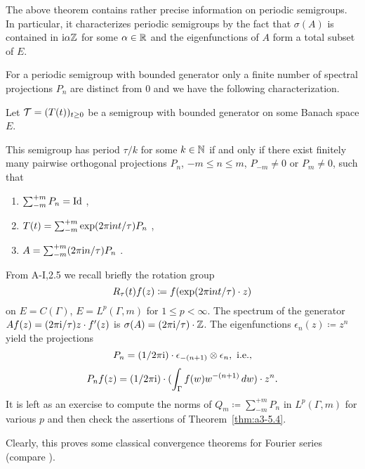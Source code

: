 The above theorem contains rather precise information on periodic semigroups.
In particular, it characterizes periodic semigroups by the fact that $\sigma(A)$ is contained in $\mathrm{i}\alpha\mathbb{Z}$ for some $\alpha \in \mathbb{R}$ and the eigenfunctions of $A$ form a total subset of $E$.

For a periodic semigroup with bounded generator
only a finite number of spectral projections $P_{n}$ are distinct from $0$ and we have the following characterization.
\begin{corollary}\label{cor:a3-5.5}
Let $\mathcal{T} = (T(t))_{t \geq 0}$ be a semigroup with bounded generator on some Banach space $E$.

This semigroup has period $\tau/k$ for some $k \in \mathbb{N}$ if and only if there exist finitely many pairwise orthogonal projections $P_{n}$, $-m \leq n \leq m$, $P_{-m} \neq 0$ or $P_{m} \neq 0$, such that
\begin{enumerate}[\upshape (i)]
\item 
$\sum_{-m}^{+m} P_{n} =  \operatorname{Id}$ ,

\item 
$T(t) = \sum_{-m}^{+m} \exp(2\pi\mathrm{i} nt/\tau)P_{n}$ ,

\item 
$A = \sum_{-m}^{+m} (2\pi\mathrm{i} n/\tau)P_{n}$ .

\end{enumerate}
\end{corollary}
\begin{example}\label{ex:a3-5.6}%
From A-I,2.5 we recall briefly the rotation group
\[
R_{\tau}(t)f(z) \coloneqq f(\exp(2\pi\mathrm{i} nt/\tau) \cdot z)
\]
on $E = C(\Gamma)$, \resp $E = L^{p}(\Gamma,m)$ for $1 \leq p < \infty$.
The spectrum of the generator\quad
$Af(z) = (2\pi\mathrm{i} /\tau)z \cdot f'(z)$\quad
is \quad $\sigma(A) = (2\pi\mathrm{i} /\tau)\cdot\mathbb{Z}$.
The eigenfunctions $\epsilon_{n}(z) \coloneqq z^{n}$ yield the projections
\[
P_{n} = (1/2\pi\mathrm{i} )\cdot\epsilon_{-(n+1)} \otimes \epsilon_{n}, \text{ i.e.,}
\]
\[
P_{n}f(z) = (1/2\pi\mathrm{i} )\cdot(\int_{\Gamma} f(w)w^{-(n+1)} \, dw)\cdot z^{n} .
\]
It is left as an exercise to compute the norms of $Q_{m} \coloneqq \sum_{-m}^{+m} P_{n}$ in $L^{p}(\Gamma,m)$ for various $p$ and then check the assertions of Theorem~\ref{thm:a3-5.4}.

Clearly, this proves some classical convergence theorems for Fourier series (compare \citet[Chap.8.1]{davies:1980}).
\end{example}


